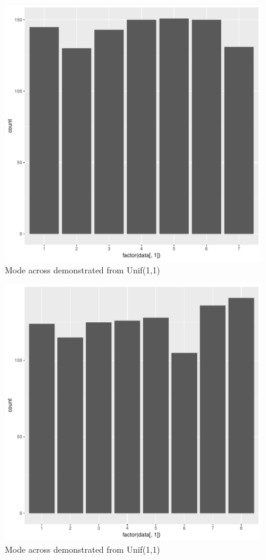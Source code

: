 \documentclass[11pt]{article}
\begin{document}
\begin{enumerate}
\begin{enumerate}
\begin{figure}[H]
	\end{figure}
	\begin{figure}[H]
		\centering
		\caption{Mode across demonstrated from Unif(1,1)}
		\includegraphics[scale=.4]{8graph.pdf}
	\end{figure}
	\begin{figure}[H]
		\centering
		\caption{Mode across demonstrated from Unif(1,1)}
		\includegraphics[scale=.4]{9graph.pdf}

\end{figure}
\end{enumerate}
\end{enumerate}
\end{document}
